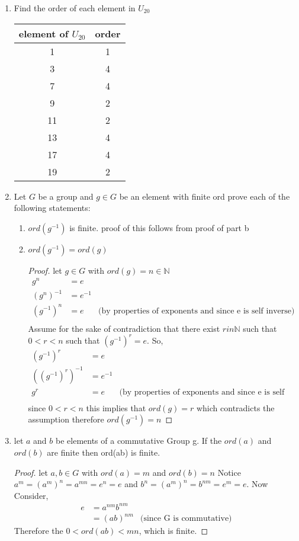 \documentclass{article}
\newcommand{\N}{\mathbb{N}}
\begin{document}
\begin{enumerate}
		\item Find the order of each element in $U_{20}$
		\begin{center}
			\begin{tabular}{|c|c|}
				\hline element of $U_{20}$ & order \\ \hline\hline
				1 & 1  \\ \hline
				3 & 4  \\ \hline
				7 & 4  \\ \hline
				9 & 2  \\ \hline
				11 & 2 \\ \hline
				13 & 4 \\ \hline
				17 & 4 \\ \hline
				19 & 2 \\ \hline  
			\end{tabular}
		\end{center}
		\item Let $G$ be a group and $g \in G$ be an element with finite ord prove each of the following statements: 
		\begin{enumerate}
			\item $ord(g^{-1})$ is finite. proof of this follows from proof of part b
			\item $ord(g^{-1}) = ord(g)$ 
			\begin{proof}
				let $g \in G$ with $ord(g) = n \in \N$  
				\begin{align*}
					g^n &= e \\
					(g^n)^{-1} &= e^{-1} \\
					(g^{-1})^n &= e &\text{(by properties of exponents and since e is self inverse)}\\
				\end{align*}
				Assume for the sake of contradiction that there exist $r in \N$ such that $0 < r < n$ such that $(g^{-1})^r = e$.
				So, 
				\begin{align*}
					(g^{-1})^r &= e\\
					((g^{-1})^r)^{-1} &= e^{-1}\\
					g^r &= e &\text{(by properties of exponents and since e is self inverse)}\\
				\end{align*}
				since $0<r <n$ this implies that $ord(g)=r$ which contradicts the assumption therefore $ord(g^{-1})=n$
			\end{proof}
		\end{enumerate}
		\item let $a$ and $b$ be elements of a commutative Group g. If the $ord(a)$ and $ord(b)$ are finite then ord(ab) is finite.
		\begin{proof}
			let $a,b \in G$ with $ord(a) = m$ and $ord(b) = n$
			Notice $a^m = (a^{m})^n =a^{mn}= e^n = e$ and $b^n =(a^{m})^n = b^{nm} = e^m = e$.
			Now Consider,
			\begin{align*}
				e 	&= a^{nm}b^{nm}\\
					&= (ab)^{nm} &\text{(since G is commutative)}
			\end{align*}
			Therefore the $0 < ord(ab) <mn$, which is finite. 
		\end{proof} 
	\end{enumerate}
\end{document}
